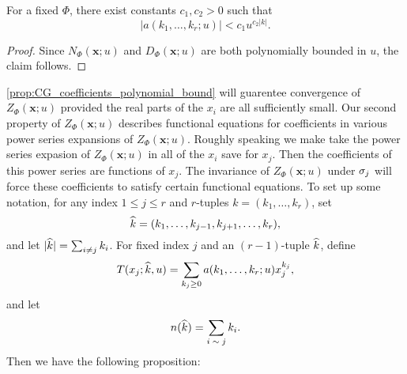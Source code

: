     \begin{proposition}\label{prop:CG_coefficients_polynomial_bound}
        For a fixed $\Phi$, there exist constants $c_{1},c_{2} > 0$ such that
        \[
            |a(k_{1},\ldots,k_{r};u)| < c_{1}u^{c_{2}|k|}.
        \]
    \end{proposition}
    \begin{proof}
        Since $N_{\Phi}(\mathbf{x};u)$ and $D_{\Phi}(\mathbf{x};u)$ are both polynomially bounded in $u$, the claim follows.
    \end{proof}

    \cref{prop:CG_coefficients_polynomial_bound} will guarentee convergence of $Z_{\Phi}(\mathbf{x};u)$ provided the real parts of the $x_{i}$ are all sufficiently small. Our second property of $Z_{\Phi}(\mathbf{x};u)$ describes functional equations for coefficients in various power series expansions of $Z_{\Phi}(\mathbf{x};u)$. Roughly speaking we make take the power series expasion of $Z_{\Phi}(\mathbf{x};u)$ in all of the $x_{i}$ save for $x_{j}$. Then the coefficients of this power series are functions of $x_{j}$. The invariance of $Z_{\Phi}(\mathbf{x};u)$ under $\sigma_{j}$ will force these coefficients to satisfy certain functional equations. To set up some notation, for any index $1 \le j \le r$ and $r$-tuples $k = (k_{1},\ldots,k_{r})$, set
    \[
        \widehat{k} = (k_{1},\ldots,k_{j-1},k_{j+1},\ldots,k_{r}),
    \]
    and let $|\widehat{k}| = \sum_{i \neq j}k_{i}$. For fixed index $j$ and an $(r-1)$-tuple $\widehat{k}$, define
    \[
        T(x_{j};\widehat{k},u) = \sum_{k_{j} \ge 0}a(k_{1},\ldots,k_{r};u)x_{j}^{k_{j}},
    \]
    and let
    \[
        n(\widehat{k}) = \sum_{\text{$i \sim j$}}k_{i}.
    \]
    Then we have the following proposition:

